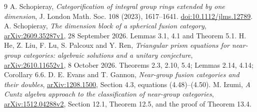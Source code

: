 \documentclass[11pt]{article}
\begin{document}
\begin{thebibliography}{9}
 A. Schopieray, \emph{Categorification of integral group
rings extended by one dimension}, J. London Math. Soc. 108 (2023),
1617--1641. \href{https://doi.org/10.1112/jlms.12789}{doi:10.1112/jlms.12789}.
 A. Schopieray, \emph{The dimension block of a spherical
fusion category}, \href{https://arxiv.org/abs/2609.35287v1}{arXiv:2609.35287v1},
28 September 2026. Lemmas 3.1, 4.1 and Theorem 5.1.
 H. He, Z. Liu, F. Lu, S. Palcoux and Y. Ren,
\emph{Triangular prism equations for near-group categories: algebraic
solutions and a unitary conjecture},
\href{https://arxiv.org/abs/2610.11652v1}{arXiv:2610.11652v1},
8 October 2026. Theorems 2.3, 2.10, 5.4; Lemmas 2.14, 4.14;
Corollary 6.6.
 D. E. Evans and T. Gannon, \emph{Near-group fusion
categories and their doubles},
\href{https://arxiv.org/abs/1208.1500}{arXiv:1208.1500},
Section 4.3, equations (4.48)--(4.50).
 M. Izumi, \emph{A Cuntz algebra approach to the
classification of near-group categories},
\href{https://arxiv.org/abs/1512.04288v2}{arXiv:1512.04288v2},
Section 12.1, Theorem 12.5, and the proof of Theorem 13.4.
\end{thebibliography}
\end{document}
